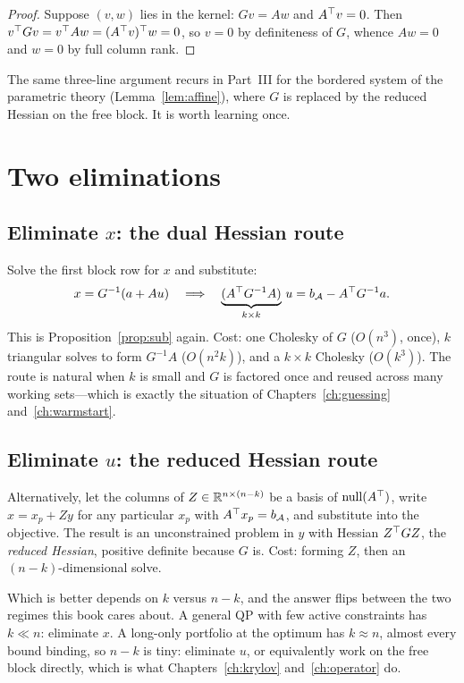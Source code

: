 \begin{proof}
Suppose $(v,w)$ lies in the kernel: $Gv = Aw$ and $A^{\top} v = 0$. Then
$v^{\top} G v = v^{\top} A w = (A^{\top} v)^{\top} w = 0$, so $v = 0$ by definiteness of $G$, whence
$Aw = 0$ and $w = 0$ by full column rank.
\end{proof}

The same three-line argument recurs in Part~III for the bordered system of the
parametric theory (Lemma~\ref{lem:affine}), where $G$ is replaced by the reduced
Hessian on the free block. It is worth learning once.

\section{Two eliminations}

\subsection{Eliminate $x$: the dual Hessian route}

Solve the first block row for $x$ and substitute:
\[
  x = G^{-1}(a + Au)
  \quad\Longrightarrow\quad
  \underbrace{(A^{\top} G^{-1} A)}_{k \times k}\,u = b_{\mathcal{A}} - A^{\top} G^{-1}a .
\]
This is Proposition~\ref{prop:sub} again. Cost: one Cholesky of $G$ ($O(n^3)$,
once), $k$ triangular solves to form $G^{-1}A$ ($O(n^2 k)$), and a $k\times k$
Cholesky ($O(k^3)$). The route is natural when $k$ is small and $G$ is factored
once and reused across many working sets---which is exactly the situation of
Chapters~\ref{ch:guessing} and~\ref{ch:warmstart}.

\subsection{Eliminate $u$: the reduced Hessian route}

Alternatively, let the columns of $Z \in \mathbb{R}^{n \times (n-k)}$ be a basis of
$\operatorname{null}(A^{\top})$, write $x = x_p + Z y$ for any particular $x_p$ with
$A^{\top} x_p = b_{\mathcal{A}}$, and substitute into the objective. The result is an
unconstrained problem in $y$ with Hessian $Z^{\top} G Z$, the \emph{reduced Hessian},
positive definite because $G$ is. Cost: forming $Z$, then an $(n-k)$-dimensional
solve.

Which is better depends on $k$ versus $n - k$, and the answer flips between the
two regimes this book cares about. A general QP with few active constraints has
$k \ll n$: eliminate $x$. A long-only portfolio at the optimum has $k \approx n$,
almost every bound binding, so $n - k$ is tiny: eliminate $u$, or equivalently
work on the free block directly, which is what Chapters~\ref{ch:krylov}
and~\ref{ch:operator} do.

